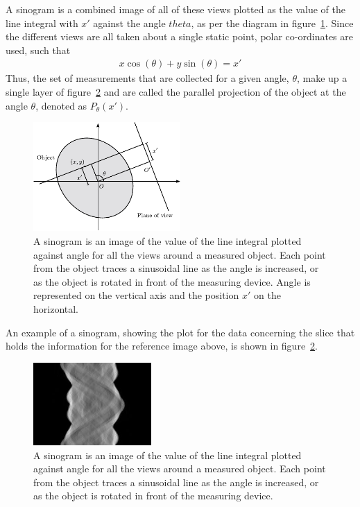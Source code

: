         A sinogram is a combined image of all of these views plotted as the value of the line integral with $x'$ against the angle $theta$, as per the diagram in figure~\ref{fig:sinogram_diag}. Since the different views are all taken about a single static point, polar co-ordinates are used, such that
        \begin{align}
            x\cos(\theta) + y\sin(\theta) = x'
        \end{align}
        Thus, the set of measurements that are collected for a given angle, $\theta$, make up a single layer of figure~\ref{fig:example_sinogram} and are called the parallel projection of the object at the angle $\theta$, denoted as $P_{\theta}(x')$.
        \begin{figure}[ht]
            \begin{center}
                \includegraphics[width=0.5\textwidth]{Files/report_images/sinogram_diag.pdf}
            \end{center}
            \caption{A sinogram is an image of the value of the line integral plotted against angle for all the views around a measured object. Each point from the object traces a sinusoidal line as the angle is increased, or as the object is rotated in front of the measuring device. Angle is represented on the vertical axis and the position $x'$ on the horizontal.\label{fig:sinogram_diag}}
        \end{figure}

        An example of a sinogram, showing the plot for the data concerning the slice that holds the information for the reference image above, is shown in figure~\ref{fig:example_sinogram}.
        \begin{figure}[ht]
            \begin{center}
                \includegraphics[width=0.4\textwidth]{Files/report_images/example_sinograph.jpg}
            \end{center}
            \caption{A sinogram is an image of the value of the line integral plotted against angle for all the views around a measured object. Each point from the object traces a sinusoidal line as the angle is increased, or as the object is rotated in front of the measuring device.\label{fig:example_sinogram}}
        \end{figure}

